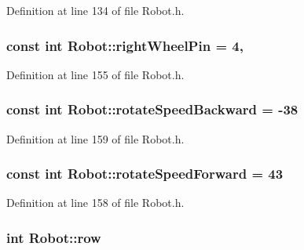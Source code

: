 Definition at line 134 of file Robot.\-h.

\hypertarget{classRobot_a572525b971da4e0f272f5f1259f6c84f}{
\subsubsection[{right\-Wheel\-Pin}]{\setlength{\rightskip}{0pt plus 5cm}const int Robot\-::right\-Wheel\-Pin = 4\hspace{0.3cm}{\ttfamily [static]}, {\ttfamily [private]}}}\label{classRobot_a572525b971da4e0f272f5f1259f6c84f}


Definition at line 155 of file Robot.\-h.

\hypertarget{classRobot_a04bc29522467c056ae6698017f32f048}{
\subsubsection[{rotate\-Speed\-Backward}]{\setlength{\rightskip}{0pt plus 5cm}const int Robot\-::rotate\-Speed\-Backward = -\/38\hspace{0.3cm}{\ttfamily [private]}}}\label{classRobot_a04bc29522467c056ae6698017f32f048}


Definition at line 159 of file Robot.\-h.

\hypertarget{classRobot_a9cf41f47520ed8f848da5c6e2d0ff7b0}{
\subsubsection[{rotate\-Speed\-Forward}]{\setlength{\rightskip}{0pt plus 5cm}const int Robot\-::rotate\-Speed\-Forward = 43\hspace{0.3cm}{\ttfamily [private]}}}\label{classRobot_a9cf41f47520ed8f848da5c6e2d0ff7b0}


Definition at line 158 of file Robot.\-h.

\hypertarget{classRobot_a35ce5c416a079fcf6b943843ec151d63}{
\subsubsection[{row}]{\setlength{\rightskip}{0pt plus 5cm}int Robot\-::row}}\label{classRobot_a35ce5c416a079fcf6b943843ec151d63}


